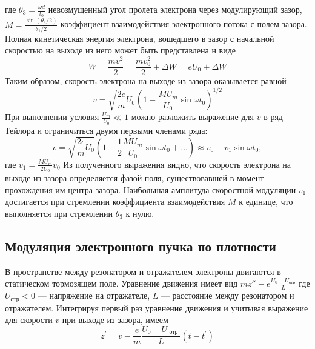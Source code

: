 где $\theta _ { 3 } = \frac { \omega d } { t _ { 0 } }$  невозмущенный угол пролета электрона через модулирующий зазор, 
$M = \frac { \sin \left( \theta _ { 3 } / 2 \right) } { \theta _ { 1 } / 2 }$ коэффициент взаимодействия электронного потока
с полем зазора. Полная кинетическая энергия электрона, вошедшего в зазор
с начальной скоростью на выходе из него может быть представлена н
виде
\begin{equation}
	W = \frac { m v ^ { 2 } } { 2 } = \frac { m v_0 ^ { 2 } } { 2 } + \Delta W = e U _ { 0 } + \Delta W
\end{equation}
Таким образом, скорость электрона на выходе из зазора оказывается равной
\begin{equation}
	v = \sqrt { \frac { 2 e } { m } U _ { 0 } } \left( 1 - \frac { M U _ { m } } { U _ { 0 } } \sin \omega t _ { 0 } \right) ^ { 1 / 2 }
\end{equation}
При выполнении условия $\frac { U _ { m } } { U _ { 0 } } \ll 1$ можно разложить выражение для $v$ в ряд Тейлора и ограничиться двумя первыми членами ряда:
\begin{equation}
	v = \sqrt { \frac { 2 \epsilon } { m } U _ { 0 } } \left( 1 - \frac { 1 } { 2 } \frac { M U _ { m } } { U _ { 0 } } \sin \omega t _ { 0 } + \ldots \right) \approx v _ { 0 } - v _ { 1 } \sin \omega t _ { 0 },
\end{equation} где $v _ { 1 } = \frac { M U _ { m } } { 2 U _ { 0 } } v _ { 0 }$
Из полученного выражения видно, что скорость электро­на на выходе из зазора определяется фазой поля, существовавшей в момент
прохождения им центра зазора. Наибольшая амплитуда скоростной моду­ляции $v_1$ достигается при стремлении коэффициента взаимодействия $M$ к 
единице, что выполняется при стремлении $\theta_3$ к нулю.

\subsection{Модуляция электронного пучка по плотности}
В пространстве между резонатором и отражателем электроны двигаются в статическом тормозящем поле. Уравнение движения имеет вид 
$mz''- e \frac { U _ { 0 } - U _ { \text{отр} } } { L }$ где $U_{\text{отр}} < 0$ — напряжение на отражателе, $L$ — расстояние между резонатором и отражателем. Интегрируя первый раз уравнение дви­жения и учитывая выражение для скорости $v$ при выходе из зазора, имеем
\begin{equation}
	z ^ { \prime } = v - \frac { e } { m } \frac { U _ { 0 } - U _ { \text { отр } } } { L } \left( t - t ^ { \prime } \right)
\end{equation}

